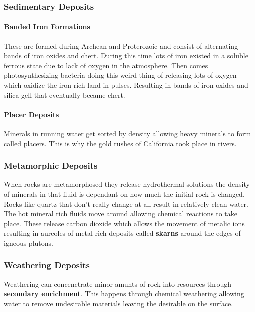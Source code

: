 \documentclass{article}
\begin{document}

\subsubsection{Sedimentary Deposits} %
\label{sub:sedimentary_deposits}

\paragraph{Banded Iron Formations} %
\label{par:banded_iron_formations}
These are formed during Archean and Proterozoic and consist of alternating bands of iron oxides and chert. During this time lots of iron existed in a soluble ferrous state due to lack of oxygen in the atmosphere. Then comes photosynthesizing bacteria doing this weird thing of releasing lots of oxygen which oxidize the iron rich land in pulses. Resulting in bands of iron oxides and silica gell that eventually became chert.

\paragraph{Placer Deposits} %
\label{par:placer_deposits}
Minerals in running water get sorted by density allowing heavy minerals to form called placers. This is why the gold rushes of California took place in rivers.


\subsubsection{Metamorphic Deposits} %
\label{sub:metamorphic_deposits}
When rocks are metamorphosed they release hydrothermal solutions the density of minerals in that fluid is dependant on how much the initial rock is changed. Rocks like quartz that don't really change at all result in relatively clean water. The hot mineral rich fluids move around allowing chemical reactions to take place. These release carbon dioxide which allows the movement of metalic ions resulting in aureoles of metal-rich deposits called \textbf{skarns} around the edges of igneous plutons.

\subsubsection{Weathering Deposits} %
\label{sub:weathering_deposits}
Weathering can concenctrate minor amunts of rock into resources through \textbf{secondary enrichment}. This happens through chemical weathering allowing water to remove undesirable materials leaving the desirable on the surface.
\end{document}
